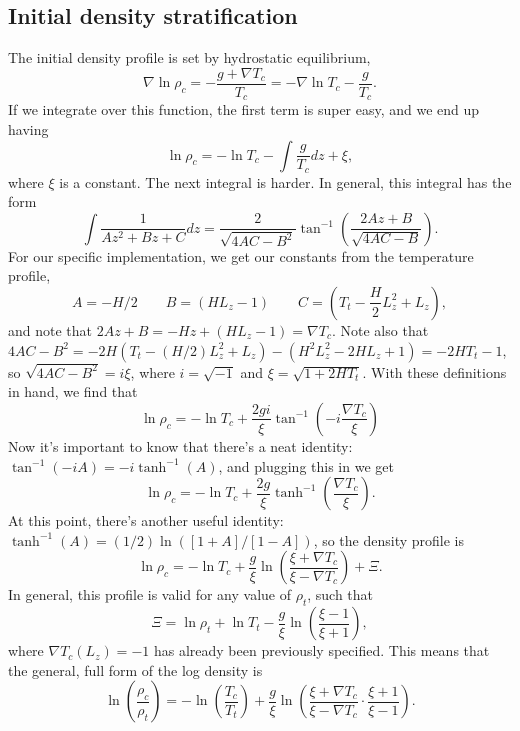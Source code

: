 \documentclass[aps, pre, onecolumn, nofootinbib, notitlepage, groupedaddress, amsfonts, amssymb, amsmath, longbibliography]{revtex4-1}
\newcommand{\grad}{\ensuremath{\nabla}}
\begin{document}
\subsection{Initial density stratification}

The initial density profile is set by hydrostatic equilibrium,
\begin{equation}
\grad\ln\rho_c = -\frac{g + \grad T_c}{T_c} = -\grad\ln T_c- \frac{g}{T_c}.
\end{equation}
If we integrate over this function, the first term is super easy, and we end up having
\begin{equation}
\ln\rho_c = - \ln T_c - \int\frac{g}{T_c}dz + \xi,
\end{equation}
where $\xi$ is a constant.  The next integral is harder.  In general, this integral has the form
\begin{equation}
\int \frac{1}{Az^2 + Bz + C}dz = \frac{2}{\sqrt{4 AC - B^2}} \tan^{-1}\left(\frac{2 Az + B}{\sqrt{4 AC - B}}\right).
\end{equation}
For our specific implementation, we get our constants from the temperature profile,
$$
A = -H / 2 \qquad B = (HL_z - 1) \qquad C = \left(T_t - \frac{H}{2}L_z^2 + L_z\right),
$$
and note that $2Az + B = -Hz + (HL_z - 1) = \grad T_c$.  Note also that
$4AC - B^2 = -2H(T_t - (H/2)L_z^2 + L_z) - (H^2 L_z^2 - 2HL_z + 1) = -2HT_t - 1$,
so $\sqrt{4AC - B^2} = i\xi$, where $i = \sqrt{-1}$ and $\xi = \sqrt{1 + 2HT_t}$.
With these definitions in hand, we find that
\begin{equation}
\ln\rho_c = -\ln T_c + \frac{2 g i}{\xi}\tan^{-1}\left(-i\frac{\grad T_c}{\xi}\right)
\end{equation}
Now it's important to know that there's a neat identity: $\tan^{-1}(-i A) = -i\tanh^{-1}(A)$,
and plugging this in we get
\begin{equation}
\ln\rho_c = -\ln T_c + \frac{2 g}{\xi}\tanh^{-1}\left(\frac{\grad T_c}{\xi}\right).
\end{equation}
At this point, there's another useful identity: $\tanh^{-1}(A) = (1/2)\ln([1 + A]/[1 - A])$,
so the density profile is
\begin{equation}
\ln\rho_c = -\ln T_c + \frac{g}{\xi}\ln\left(\frac{\xi + \grad T_c}{\xi - \grad T_c}\right) + \Xi.
\end{equation}
In general, this profile is valid for any value of $\rho_t$, such that
\begin{equation}
\Xi = \ln\rho_t + \ln T_t - \frac{g}{\xi}\ln\left(\frac{\xi - 1}{\xi + 1}\right),
\end{equation}
where $\grad T_c(L_z) = -1$ has already been previously specified.  This means that the general,
full form of the log density is
\begin{equation}
\boxed{
\ln\left(\frac{\rho_c}{\rho_t}\right) = -\ln\left(\frac{T_c}{T_t}\right) + 
\frac{g}{\xi}\ln\left(\frac{\xi + \grad T_c}{\xi - \grad T_c}\cdot\frac{\xi + 1}{\xi - 1}\right) }.
\end{equation}
\end{document}
